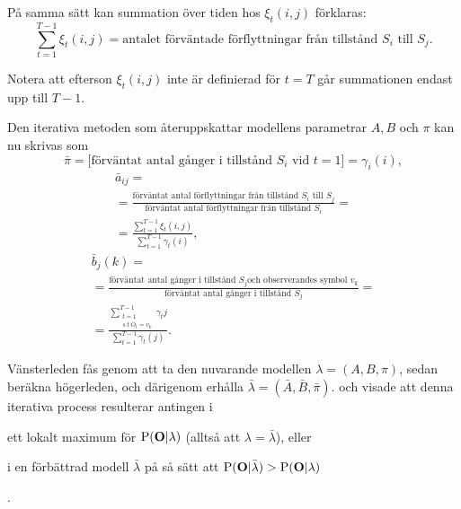 \documentclass[../rapport_MVEX01-11-05]{subfiles}
\begin{document}
På samma sätt kan summation över tiden hos  $\xi_t(i,j)$ förklaras:
\begin{equation*}
\sum_{t=1}^{T-1}\xi_t(i,j) = \text{antalet förväntade förflyttningar
  från tillstånd $S_i$ till $S_j$}.
\end{equation*}

Notera att efterson $\xi_t(i,j)$ inte är definierad för $t=T$ går summationen 
endast upp till $T -1$. 

Den iterativa metoden som återuppskattar modellens parametrar $A,B$
och $\pi$ kan nu skrivas som
\begin{equation*}
\bar{\pi} = \text{[förväntat antal gånger i tillstånd $S_i$ vid
  $t=1$]} = \gamma_i(i),
\end{equation*}
\begin{multline*}
\bar{a}_{ij} = \\ = \frac{\text{förväntat antal förflyttningar från
    tillstånd $S_i$ till $S_j$}}{\text{förväntat antal förflyttningar
    från tillstånd $S_i$}} = \\ =
\frac{\sum_{t=1}^{T-1}\xi_t(i,j)}{\sum_{t=1}^{T-1}\gamma_t(i)},
\end{multline*}
\begin{multline*}
\bar{b}_j(k) = \\ = \frac{\text{förväntat antal gånger i tillstånd $S_j$
    och observerandes symbol $v_k$}}{\text{förväntat antal gånger i
    tillstånd $S_j$}} = \\ = \frac{\sum_{\substack{t=1\\s.t~ O_t =
      v_k}}^{T-1}\gamma_t{j}}{\sum_{t=1}^{T-1}\gamma_t(j)}.
\end{multline*}

Vänsterleden fås genom att ta den nuvarande modellen $\lambda =
(A,B,\pi)$, sedan beräkna högerleden, och därigenom erhålla $\bar{\lambda} =
(\bar{A},\bar{B}, \bar{\pi})$.  och 
visade att denna iterativa process resulterar antingen i
\begin{inparaenum}
	\item ett lokalt maximum för $\mathrm{P}(\mathbf{O}|\lambda)$
  (alltså att $\lambda = \bar{\lambda}$), eller
 	\item i en förbättrad modell $\bar{\lambda}$ på så sätt att
  $\mathrm{P}(\mathbf{O}|\bar{\lambda}) > \mathrm{P}(\mathbf{O}|\lambda)$
\end{inparaenum}. 
\end{document}
